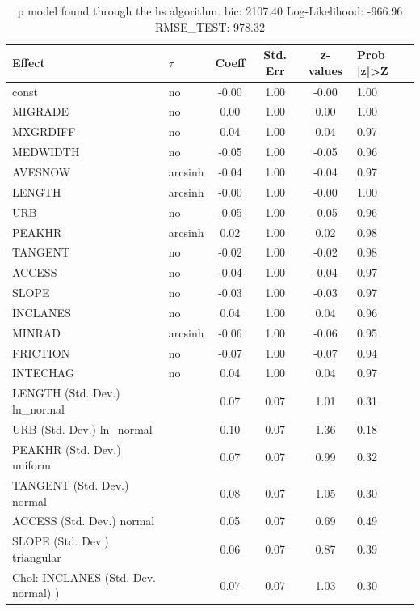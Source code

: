 \begin{table}
	\caption{p model found through the hs algorithm. bic: 2107.40 Log-Likelihood: -966.96 RMSE_TEST: 978.32}
	\begin{center}
		\begin{tabular}{|l|l|c|c|c|l|}
			\hline
			Effect & $\tau$ & Coeff & Std. Err & z-values & Prob |z|>Z \\
			\hline
			const & no & -0.00 & 1.00 & -0.00 & 1.00 \\
			\hline
			MIGRADE & no & 0.00 & 1.00 & 0.00 & 1.00 \\
			\hline
			MXGRDIFF & no & 0.04 & 1.00 & 0.04 & 0.97 \\
			\hline
			MEDWIDTH & no & -0.05 & 1.00 & -0.05 & 0.96 \\
			\hline
			AVESNOW & arcsinh & -0.04 & 1.00 & -0.04 & 0.97 \\
			\hline
			LENGTH & arcsinh & -0.00 & 1.00 & -0.00 & 1.00 \\
			\hline
			URB & no & -0.05 & 1.00 & -0.05 & 0.96 \\
			\hline
			PEAKHR & arcsinh & 0.02 & 1.00 & 0.02 & 0.98 \\
			\hline
			TANGENT & no & -0.02 & 1.00 & -0.02 & 0.98 \\
			\hline
			ACCESS & no & -0.04 & 1.00 & -0.04 & 0.97 \\
			\hline
			SLOPE & no & -0.03 & 1.00 & -0.03 & 0.97 \\
			\hline
			INCLANES & no & 0.04 & 1.00 & 0.04 & 0.96 \\
			\hline
			MINRAD & arcsinh & -0.06 & 1.00 & -0.06 & 0.95 \\
			\hline
			FRICTION & no & -0.07 & 1.00 & -0.07 & 0.94 \\
			\hline
			INTECHAG & no & 0.04 & 1.00 & 0.04 & 0.97 \\
			\hline
			LENGTH (Std. Dev.) ln_normal &  & 0.07 & 0.07 & 1.01 & 0.31 \\
			\hline
			URB (Std. Dev.) ln_normal &  & 0.10 & 0.07 & 1.36 & 0.18 \\
			\hline
			PEAKHR (Std. Dev.) uniform &  & 0.07 & 0.07 & 0.99 & 0.32 \\
			\hline
			TANGENT (Std. Dev.) normal &  & 0.08 & 0.07 & 1.05 & 0.30 \\
			\hline
			ACCESS (Std. Dev.) normal &  & 0.05 & 0.07 & 0.69 & 0.49 \\
			\hline
			SLOPE (Std. Dev.) triangular &  & 0.06 & 0.07 & 0.87 & 0.39 \\
			\hline
			 Chol: INCLANES (Std. Dev. normal) ) &  & 0.07 & 0.07 & 1.03 & 0.30 \\

\end{tabular}
\end{center}
\end{table}
